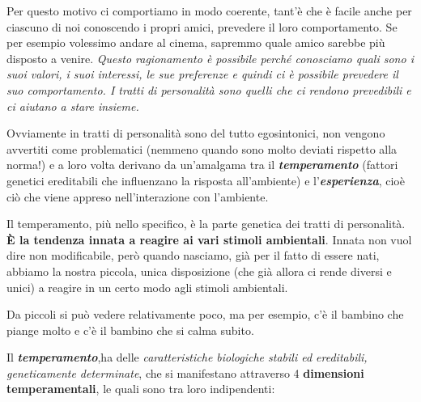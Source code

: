 Per questo motivo ci comportiamo in modo coerente, tant'è che è facile
anche per ciascuno di noi conoscendo i propri amici, prevedere il loro
comportamento. Se per esempio volessimo andare al cinema, sapremmo quale
amico sarebbe più disposto a venire. \emph{\emph{Questo ragionamento è
possibile perché conosciamo quali sono i suoi valori, i suoi interessi,
le sue preferenze e quindi ci è possibile prevedere il suo
comportamento. I tratti di personalità sono quelli che ci rendono
prevedibili e ci aiutano a stare insieme. }}

Ovviamente in tratti di personalità sono del tutto egosintonici, non
vengono avvertiti come problematici (nemmeno quando sono molto deviati
rispetto alla norma!) e a loro volta derivano da un'amalgama tra il
\textbf{\emph{temperamento}} (fattori genetici ereditabili che
influenzano la risposta all'ambiente) e l'\textbf{\emph{esperienza}},
cioè ciò che viene appreso nell'interazione con l'ambiente.

Il temperamento, più nello specifico, è la parte genetica dei tratti di
personalità. \textbf{È la tendenza innata a reagire ai vari stimoli
ambientali}. Innata non vuol dire non modificabile, però quando
nasciamo, già per il fatto di essere nati, abbiamo la nostra piccola,
unica disposizione (che già allora ci rende diversi e unici) a reagire
in un certo modo agli stimoli ambientali.

Da piccoli si può vedere relativamente poco, ma per esempio, c'è il
bambino che piange molto e c'è il bambino che si calma subito.

Il \textbf{\emph{temperamento}},ha delle \emph{caratteristiche
biologiche stabili ed ereditabili, geneticamente determinate}, che si
manifestano attraverso 4 \textbf{dimensioni temperamentali}, le quali
sono tra loro indipendenti:

